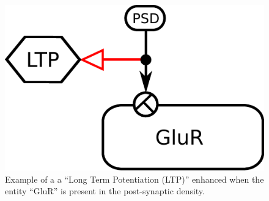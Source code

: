 \begin{figure}[H]
  \centering
  \includegraphics[scale = 0.5]{examples/ex-stimulation}
  \caption{Example of a   a  ``Long Term Potentiation (LTP)'' enhanced when the entity ``GluR'' is present in the post-synaptic density.}
  \label{fig:ex-stimulation}
\end{figure}

\normalcolor



